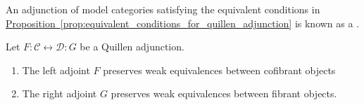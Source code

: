 \documentclass[main.tex]{subfiles}
\begin{document}
\begin{definition}
  \label{def:quillen_adjunction}
  An adjunction of model categories satisfying the equivalent conditions in \hyperref[prop:equivalent_conditions_for_quillen_adjunction]{Proposition~\ref*{prop:equivalent_conditions_for_quillen_adjunction}} is known as a .
\end{definition}

\begin{lemma}
  \label{lemma:ken_browns_lemma}
  Let $F : \mathcal{C} \leftrightarrow \mathcal{D} : G$ be a Quillen adjunction.
  \begin{enumerate}
    \item The left adjoint $F$ preserves weak equivalences between cofibrant objects

    \item The right adjoint $G$ preserves weak equivalences between fibrant objects.
  \end{enumerate}
\end{lemma}
\end{document}
